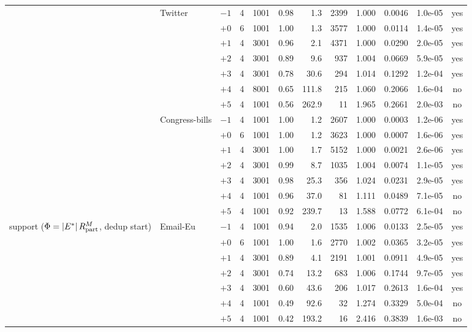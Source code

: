 \begin{table}[t]
\begin{tabular}{llrrrrrrrrrc}
\addlinespace[2pt]
 & Twitter & $-1$ & 4 & 1001 & 0.98 & 1.3 & 2399 & 1.000 & 0.0046 & 1.0e-05 & yes \\
 &  & $+0$ & 6 & 1001 & 1.00 & 1.3 & 3577 & 1.000 & 0.0114 & 1.4e-05 & yes \\
 &  & $+1$ & 4 & 3001 & 0.96 & 2.1 & 4371 & 1.000 & 0.0290 & 2.0e-05 & yes \\
 &  & $+2$ & 4 & 3001 & 0.89 & 9.6 & 937 & 1.004 & 0.0669 & 5.9e-05 & yes \\
 &  & $+3$ & 4 & 3001 & 0.78 & 30.6 & 294 & 1.014 & 0.1292 & 1.2e-04 & yes \\
 &  & $+4$ & 4 & 8001 & 0.65 & 111.8 & 215 & 1.060 & 0.2066 & 1.6e-04 & no \\
 &  & $+5$ & 4 & 1001 & 0.56 & 262.9 & 11 & 1.965 & 0.2661 & 2.0e-03 & no \\
\addlinespace[2pt]
 & Congress-bills & $-1$ & 4 & 1001 & 1.00 & 1.2 & 2607 & 1.000 & 0.0003 & 1.2e-06 & yes \\
 &  & $+0$ & 6 & 1001 & 1.00 & 1.2 & 3623 & 1.000 & 0.0007 & 1.6e-06 & yes \\
 &  & $+1$ & 4 & 3001 & 1.00 & 1.7 & 5152 & 1.000 & 0.0021 & 2.6e-06 & yes \\
 &  & $+2$ & 4 & 3001 & 0.99 & 8.7 & 1035 & 1.004 & 0.0074 & 1.1e-05 & yes \\
 &  & $+3$ & 4 & 3001 & 0.98 & 25.3 & 356 & 1.024 & 0.0231 & 2.9e-05 & yes \\
 &  & $+4$ & 4 & 1001 & 0.96 & 37.0 & 81 & 1.111 & 0.0489 & 7.1e-05 & no \\
 &  & $+5$ & 4 & 1001 & 0.92 & 239.7 & 13 & 1.588 & 0.0772 & 6.1e-04 & no \\
\addlinespace[2pt]
\midrule
support ($\Phi=|E^*|\,R^{M}_{\rm part}$, dedup start) & Email-Eu & $-1$ & 4 & 1001 & 0.94 & 2.0 & 1535 & 1.006 & 0.0133 & 2.5e-05 & yes \\
 &  & $+0$ & 6 & 1001 & 1.00 & 1.6 & 2770 & 1.002 & 0.0365 & 3.2e-05 & yes \\
 &  & $+1$ & 4 & 3001 & 0.89 & 4.1 & 2191 & 1.001 & 0.0911 & 4.9e-05 & yes \\
 &  & $+2$ & 4 & 3001 & 0.74 & 13.2 & 683 & 1.006 & 0.1744 & 9.7e-05 & yes \\
 &  & $+3$ & 4 & 3001 & 0.60 & 43.6 & 206 & 1.017 & 0.2613 & 1.6e-04 & yes \\
 &  & $+4$ & 4 & 1001 & 0.49 & 92.6 & 32 & 1.274 & 0.3329 & 5.0e-04 & no \\
 &  & $+5$ & 4 & 1001 & 0.42 & 193.2 & 16 & 2.416 & 0.3839 & 1.6e-03 & no \\

\end{tabular}
\end{table}

